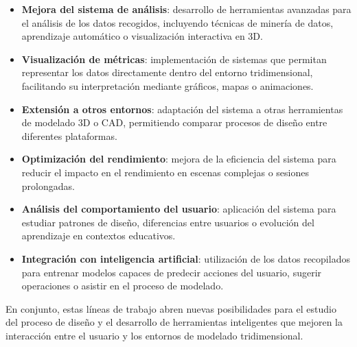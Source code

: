 \begin{itemize}

    \item \textbf{Mejora del sistema de análisis}: desarrollo de herramientas avanzadas para el análisis de los datos recogidos, incluyendo técnicas de minería de datos, aprendizaje automático o visualización interactiva en 3D.

    \item \textbf{Visualización de métricas}: implementación de sistemas que permitan representar los datos directamente dentro del entorno tridimensional, facilitando su interpretación mediante gráficos, mapas o animaciones.

    \item \textbf{Extensión a otros entornos}: adaptación del sistema a otras herramientas de modelado 3D o CAD, permitiendo comparar procesos de diseño entre diferentes plataformas.

    \item \textbf{Optimización del rendimiento}: mejora de la eficiencia del sistema para reducir el impacto en el rendimiento en escenas complejas o sesiones prolongadas.

    \item \textbf{Análisis del comportamiento del usuario}: aplicación del sistema para estudiar patrones de diseño, diferencias entre usuarios o evolución del aprendizaje en contextos educativos.

    \item \textbf{Integración con inteligencia artificial}: utilización de los datos recopilados para entrenar modelos capaces de predecir acciones del usuario, sugerir operaciones o asistir en el proceso de modelado.

\end{itemize}

En conjunto, estas líneas de trabajo abren nuevas posibilidades para el estudio del proceso de diseño y el desarrollo de herramientas inteligentes que mejoren la interacción entre el usuario y los entornos de modelado tridimensional.